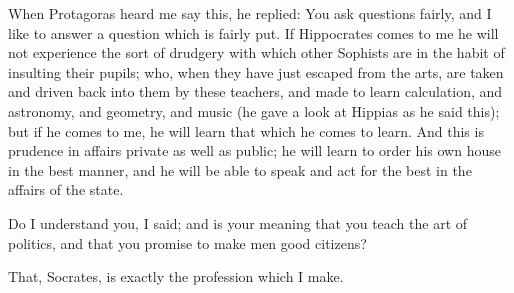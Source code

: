\documentclass[11pt,letter]{article}
\begin{document}
\par  When Protagoras heard me say this, he replied: You ask questions fairly, and I like to answer a question which is fairly put. If Hippocrates comes to me he will not experience the sort of drudgery with which other Sophists are in the habit of insulting their pupils; who, when they have just escaped from the arts, are taken and driven back into them by these teachers, and made to learn calculation, and astronomy, and geometry, and music (he gave a look at Hippias as he said this); but if he comes to me, he will learn that which he comes to learn. And this is prudence in affairs private as well as public; he will learn to order his own house in the best manner, and he will be able to speak and act for the best in the affairs of the state.

\par  Do I understand you, I said; and is your meaning that you teach the art of politics, and that you promise to make men good citizens?

\par  That, Socrates, is exactly the profession which I make.
\end{document}

